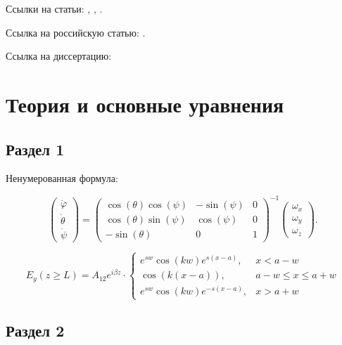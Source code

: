 \documentclass[14pt,oneside]{extarticle}
\begin{document}
Ссылки на статьи: \cite{miller1}, \cite{miller2}, \cite{mohseni1}.

Ссылка на российскую статью: \cite{skubachevskii1}.

Ссылка на диссертацию:  \cite{pavlichenko1}

\pagebreak
\section{Теория и основные уравнения}

\subsection{Раздел 1}

Ненумерованная формула:

\begin{equation}
    \begin{pmatrix} \dot{\varphi}\\ \dot{\theta} \\ \dot{\psi} \end{pmatrix}
    = \begin{pmatrix}
        \cos(\theta)\cos(\psi) & -\sin(\psi) & 0 \\
        \cos(\theta)\sin(\psi) & \cos(\psi)  & 0 \\
        -\sin(\theta)         & 0         &  1
    \end{pmatrix}^{-1}
    \begin{pmatrix} \omega_x\\ \omega_y \\ \omega_z \end{pmatrix}. \nonumber
\end{equation}


\begin{equation}
    E_{y}\left(z\geq L\right)=A_{12}e^{i\beta z}\cdot\begin{cases}
        e^{sw}\cos\left(kw\right)e^{s\left(x-a\right)}, & x<a-w\\
        \cos\left(k\left(x-a\right)\right), & a-w\leq x\le a+w\\
        e^{sw}\cos\left(kw\right)e^{-s\left(x-a\right)}, & x>a+w
        \end{cases}    
\end{equation}


\subsection{Раздел 2}
\end{document}

